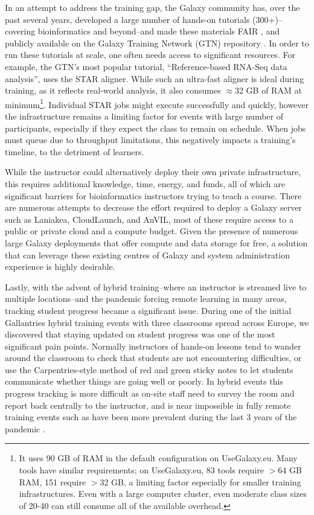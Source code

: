 \documentclass[a4paper,num-refs]{oup-contemporary}
\begin{document}
In an attempt to address the training gap, the Galaxy community has, over the past several years, developed a large number of hands-on tutorials (300+)--covering bioinformatics and beyond--and made these materials FAIR \cite{Wilkinson2016-zo,10.1371/journal.pcbi.1007854}, and publicly available on the Galaxy Training Network (GTN) repository \cite{training-site}. In order to run these tutorials at scale, one often needs access to significant resources. For example, the GTN's most popular tutorial, ``Reference-based RNA-Seq data analysis'', uses the STAR aligner\cite{Dobin2012}. While such an ultra-fast aligner is ideal during training, as it reflects real-world analysis, it also consumes $\approx$32 GB of RAM at minimum\footnote{It uses 90 GB of RAM in the default configuration on UseGalaxy.eu. Many tools have similar requirements; on UseGalaxy.eu, 83 tools require $>$64 GB RAM, 151 require $>$32 GB, a limiting factor especially for smaller training infrastructures. Even with a large computer cluster, even moderate class sizes of 20-40 can still consume all of the available overhead.}. Individual STAR jobs might execute successfully and quickly, however the infrastructure remains a limiting factor for events with large number of participants, especially if they expect the class to remain on schedule. When jobs must queue due to throughput limitations, this negatively impacts a training's timeline, to the detriment of learners.

While the instructor could alternatively deploy their own private infrastructure, this requires additional knowledge, time, energy, and funds, all of which are significant barriers for bioinformatics instructors trying to teach a course. There are numerous attempts to decrease the effort required to deploy a Galaxy server such as Laniakea\cite{Tangaro_2020}, CloudLaunch\cite{Afgan_2019}, and AnVIL\cite{Schatz_2022}, most of these require access to a public or private cloud and a compute budget. Given the presence of numerous large Galaxy deployments that offer compute and data storage for free, a solution that can leverage these existing centres of Galaxy and system administration experience is highly desirable.

Lastly, with the advent of hybrid training--where an instructor is streamed live to multiple locations--and the pandemic forcing remote learning in many areas, tracking student progress became a significant issue. During one of the initial Gallantries \cite{gallantries} hybrid training events with three classrooms spread across Europe, we discovered that staying updated on student progress was one of the most significant pain points. Normally instructors of hands-on lessons tend to wander around the classroom to check that students are not encountering difficulties, or use the Carpentries-style \cite{thecarpentries,Wilson2016} method of red and green sticky notes to let students communicate whether things are going well or poorly. In hybrid events this progress tracking is more difficult as on-site staff need to survey the room and report back centrally to the instructor, and is near impossible in fully remote training events such as have been more prevalent during the last 3 years of the pandemic \cite{Serrano_Solano_2021}.
\end{document}
